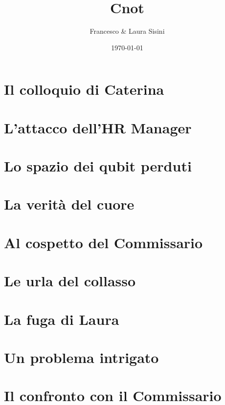 \documentclass[a4paper,9pt]{book}
\title{Cnot}
\author{Francesco \& Laura Sisini}
\date{\today}
\begin{document}



\tableofcontents
\newpage



\chapter{Il colloquio di Caterina}


\chapter{L'attacco dell'HR Manager}


\chapter{Lo spazio dei qubit perduti}


\chapter{La verità del cuore}


\chapter{Al cospetto del Commissario}


\chapter{Le urla del collasso}


\chapter{La fuga di Laura}


\chapter{Un problema intrigato}


\chapter{Il confronto con il Commissario}

\end{document}
